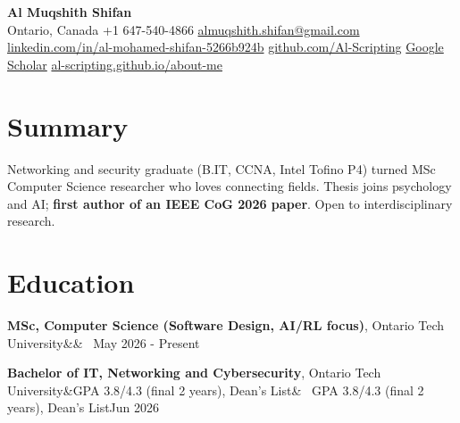 \documentclass[letterpaper,10pt]{article}
\newcommand{\entry}[4]{%
  \textbf{#1}, #3\ifx&#4&\else\ \textbar{} #4\fi \hfill #2 \par}
\begin{document}
\begin{center}
  {\LARGE\bfseries Al Muqshith Shifan} \\[3pt]
  Ontario, Canada \textbar{} +1 647-540-4866 \textbar{} \href{mailto:almuqshith.shifan@gmail.com}{almuqshith.shifan@gmail.com} \\
  \href{https://www.linkedin.com/in/al-mohamed-shifan-5266b924b/}{linkedin.com/in/al-mohamed-shifan-5266b924b} \textbar{}
  \href{https://github.com/Al-Scripting}{github.com/Al-Scripting} \textbar{}
  \href{https://scholar.google.ca/citations?user=0OwX660AAAAJ}{Google Scholar} \textbar{}
  \href{https://al-scripting.github.io/about-me/}{al-scripting.github.io/about-me}
\end{center}

\section{Summary}
Networking and security graduate (B.IT, CCNA, Intel Tofino P4) turned MSc Computer Science researcher who loves connecting fields.
Thesis joins psychology and AI; \textbf{first author of an IEEE CoG 2026 paper}. Open to interdisciplinary research.

\section{Education}
\entry{MSc, Computer Science (Software Design, AI/RL focus)}{May 2026 - Present}{Ontario Tech University}{}
\entry{Bachelor of IT, Networking and Cybersecurity}{Jun 2026}{Ontario Tech University}{GPA 3.8/4.3 (final 2 years), Dean's List}

\end{document}
